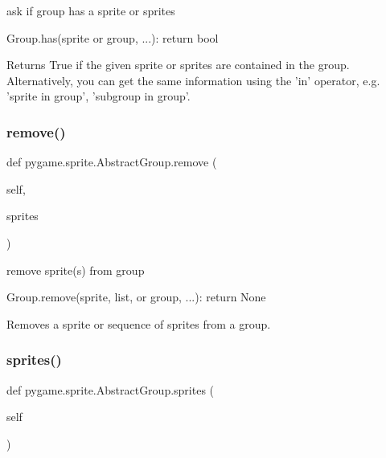 \begin{DoxyVerb}ask if group has a sprite or sprites

Group.has(sprite or group, ...): return bool

Returns True if the given sprite or sprites are contained in the
group. Alternatively, you can get the same information using the
'in' operator, e.g. 'sprite in group', 'subgroup in group'.\end{DoxyVerb}
 \mbox{\label{classpygame_1_1sprite_1_1_abstract_group_a96a38c38796b9e89468f939e2531f5ae}} 
\subsubsection{\texorpdfstring{remove()}{remove()}}
{\footnotesize\ttfamily def pygame.\+sprite.\+Abstract\+Group.\+remove (\begin{DoxyParamCaption}\item[{}]{self,  }\item[{}]{sprites }\end{DoxyParamCaption})}

\begin{DoxyVerb}remove sprite(s) from group

Group.remove(sprite, list, or group, ...): return None

Removes a sprite or sequence of sprites from a group.\end{DoxyVerb}
 \mbox{\label{classpygame_1_1sprite_1_1_abstract_group_a914ae9cbf2b6f8afc7b79dcb5e9c3b37}} 
\subsubsection{\texorpdfstring{sprites()}{sprites()}}
{\footnotesize\ttfamily def pygame.\+sprite.\+Abstract\+Group.\+sprites (\begin{DoxyParamCaption}\item[{}]{self }\end{DoxyParamCaption})}

